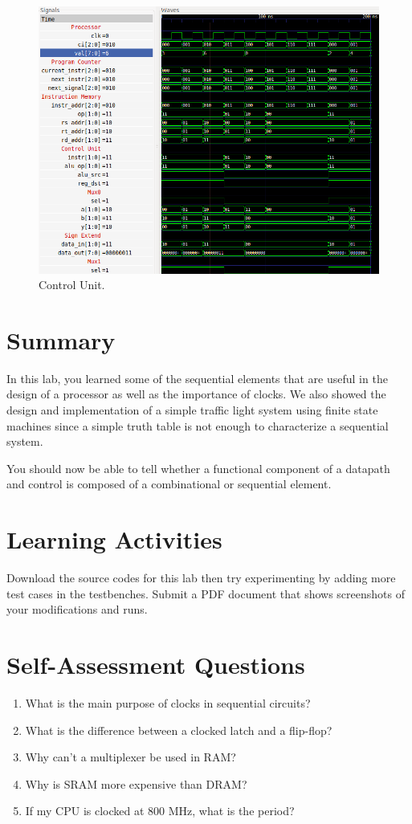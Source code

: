 \documentclass[a4paper, 11pt,oneside]{article}
\begin{document}
\begin{figure}[H]
	\begin{center}
	\includegraphics[width=6in]{sim.png}
	\caption{Control Unit.}
	\label{fig:sim} 
	\end{center}
\end{figure}


\section{Summary}
In this lab, you learned some of the sequential elements that are useful in the 
design of a processor as well as the importance of clocks. We also showed the
design and implementation of a simple traffic light system using finite state 
machines since a simple truth table is not enough to characterize a sequential 
system. 

You should now be able to tell whether a functional component of a datapath and 
control is composed of a combinational or sequential element.

\section{Learning Activities}
Download the source codes for this lab then try experimenting by adding more 
test cases in the testbenches. Submit a PDF document that shows screenshots of 
your modifications and runs. 

\section{Self-Assessment Questions}
\begin{enumerate}
\item What is the main purpose of clocks in sequential circuits?
\item What is the difference between a clocked latch and a flip-flop?
\item Why can't a multiplexer be used in RAM?
\item Why is SRAM more expensive than DRAM?
\item If my CPU is clocked at 800 MHz, what is the period?
\end{enumerate}
\end{document}
